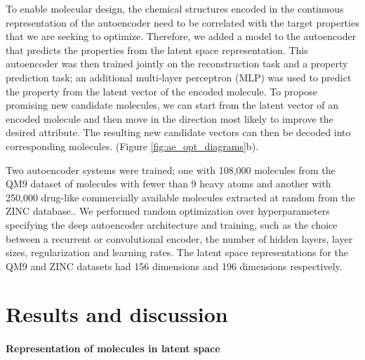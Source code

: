 To enable molecular design, the chemical structures encoded in the continuous representation of the autoencoder need to be correlated with the target properties that we are seeking to optimize. Therefore, we added a model to the autoencoder that predicts the properties from the latent space representation. This autoencoder was then trained jointly on the reconstruction task and a property prediction task; an additional multi-layer perceptron (MLP) was used to predict the property from the latent vector of the encoded molecule. To propose promising new candidate molecules, we can start from the latent vector of an encoded molecule and then move in the direction most likely to improve the desired attribute. The resulting new candidate vectors can then be decoded into corresponding molecules. (Figure \ref{fig:ae_opt_diagrams}b).

Two autoencoder systems were trained; one with 108,000 molecules from the QM9 dataset of molecules with fewer than 9 heavy atoms \cite{ramakrishnan2014quantum} and another with 250,000 drug-like commercially available molecules extracted at random from the ZINC database.\cite{irwin_2012_zinc}. We performed random optimization over hyperparameters specifying the deep autoencoder architecture and training, such as the choice between a recurrent or convolutional encoder, the number of hidden layers, layer sizes, regularization and learning rates.
The latent space representations for the QM9 and ZINC datasets had 156 dimensions and 196 dimensions respectively.

\section{Results and discussion}
\paragraph{Representation of molecules in latent space}

